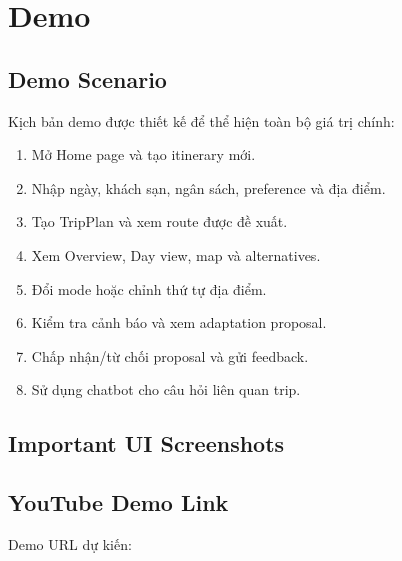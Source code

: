 \chapter{Demo}

\section{Demo Scenario}

Kịch bản demo được thiết kế để thể hiện toàn bộ giá trị chính:

\begin{enumerate}
  \item Mở Home page và tạo itinerary mới.
  \item Nhập ngày, khách sạn, ngân sách, preference và địa điểm.
  \item Tạo TripPlan và xem route được đề xuất.
  \item Xem Overview, Day view, map và alternatives.
  \item Đổi mode hoặc chỉnh thứ tự địa điểm.
  \item Kiểm tra cảnh báo và xem adaptation proposal.
  \item Chấp nhận/từ chối proposal và gửi feedback.
  \item Sử dụng chatbot cho câu hỏi liên quan trip.
\end{enumerate}

\section{Important UI Screenshots}


\section{YouTube Demo Link}


Demo URL dự kiến: \texttt{\DemoURL}
